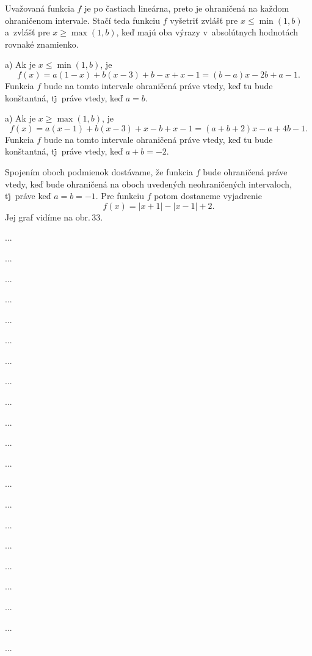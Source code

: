 {%
Uvažovaná funkcia $f$ je po častiach lineárna, preto je ohraničená na
každom ohraničenom intervale. Stačí teda funkciu $f$ vyšetriť zvlášť pre
$x\le\min(1,b)$ a~zvlášť pre $x\ge\max(1,b)$, keď majú oba výrazy
v~absolútnych hodnotách rovnaké znamienko.

a) Ak je $x\le\min(1,b)$, je
$$
f(x)=a(1-x)+b(x-3)+b-x+x-1=(b-a)x-2b+a-1.
$$
Funkcia $f$ bude na tomto intervale ohraničená práve vtedy,
keď tu bude konštantná, t\.j\.~práve vtedy, keď $a=b$.

a) Ak je $x\ge\max(1,b)$, je
$$
f(x)=a(x-1)+b(x-3)+x-b+x-1=(a+b+2)x-a+4b-1.
$$
Funkcia $f$ bude na tomto intervale ohraničená práve vtedy,
keď tu bude konštantná, t\.j\.~práve vtedy, keď $a+b=-2$.

Spojením oboch podmienok dostávame, že funkcia $f$ bude ohraničená
práve vtedy, keď bude ohraničená na oboch uvedených neohraničených
intervaloch, t\.j\.~práve keď $a=b=-1$. Pre funkciu $f$ potom
dostaneme vyjadrenie
$$
f(x)=|x+1|-|x-1|+2.
$$
Jej graf vidíme na obr.\,33.

\line{\hss\inspicture-!\hss\hss\hss\inspicture-!\hss}
\bigskip
}

{%
...}

{%
...}

{%
...}

{%
...}

{%
...}

{%
...}

{%
...}

{%
...}

{%
...}

{%
...}

{%
...}

{%
...}

{%
...}

{%
...}

{%
...}

{%
...}

{%
...}

{%
...}

{%
...}

{%
...}

{%
...}

